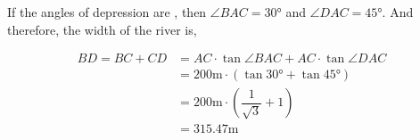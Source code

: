\begin{solution}
  If the angles of depression are \asif, then $\angle{BAC} = \ang{30}$ and $\angle{DAC} = \ang{45}$.
  And therefore, the width of the river is, 
  
  \begin{align}
  	BD = BC + CD &= AC\cdot\tan\angle{BAC} + AC\cdot\tan\angle{DAC} \\
  	  &= \text{200m}\cdot\left( \tan\ang{30} + \tan\ang{45} \right) \\
  	  &= \text{200m}\cdot\left( \dfrac{1}{\sqrt{3}} + 1\right) \\
  	  &= 315.47\text{m}
  \end{align}
\end{solution}
